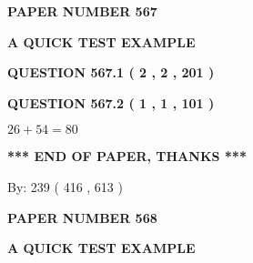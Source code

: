 \documentclass[12pt]{article}
\begin{document}
   
 {\textbf{ \Large{ PAPER NUMBER  567  }}}
   
   
\vspace{0.2in}
   
   
   
   
   
   
 \vspace{0.2in}
{\LARGE {\textbf{ A QUICK TEST EXAMPLE}}}
   
   
  
\vspace{0.2in}
  
{\textbf{\Large{QUESTION
567.1 
 ( 2 , 2 , 201 )
}}}
  
  
  
\vspace{0.2in}
  
{\textbf{\Large{QUESTION
567.2 
 ( 1 , 1 , 101 )
}}}
  
  
 
 

$ %
26 +  %
54=   %
80$
 
 
   
   
 \vspace{0.2in}
 
   
   
   
   
\vspace{1.0in} 
{\textbf{\large{ *** END OF PAPER, THANKS *** }}} 
   
   
\hspace{1.0in} By: 
 239 ( 416 ,  613 )
   
   
   
   
\newpage 
\setcounter{page}{ 
   568001 } 
   
   
   
   
 {\textbf{ \Large{ PAPER NUMBER  568  }}}
   
   
\vspace{0.2in}
   
   
   
   
   
   
 \vspace{0.2in}
{\LARGE {\textbf{ A QUICK TEST EXAMPLE}}}
   
   
  
\vspace{0.2in}
  
\end{document}
